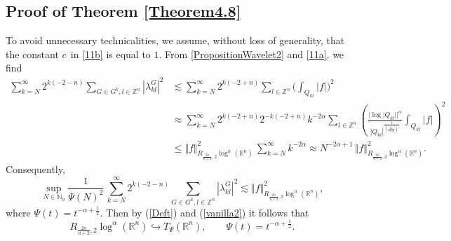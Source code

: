 \documentclass[11pt, a4paper,leqno]{amsart}
\theoremstyle{plain}
\numberwithin{equation}{section}
\theoremstyle{definition}
\theoremstyle{remark}
\begin{document}
\subsection{Proof of Theorem \ref{Theorem4.8}}
To avoid unnecessary technicalities, we assume, without loss of
generality, that the constant $c~\ $in \eqref{11b} is equal to $1.$ From \eqref{PropositionWavelet2} and 
\eqref{11a}, we find
\begin{align*}
\sum_{k=N}^{\infty}2^{k(-2-n)}\sum_{G\in G^{k},l\in\mathbb{Z}^{n}}|\lambda
_{k l}^{G}|^{2}  &  \lesssim\sum_{k=N}^{\infty}2^{k(-2+n)}\sum_{l\in
\mathbb{Z}^{n}}\bigg(\int_{Q_{kl}}|f|\bigg)^{2}\\
&  \approx \sum_{k=N}^{\infty}2^{k(-2+n)}2^{-k (-2+n)}k^{-2\alpha}%
\sum_{l\in\mathbb{Z}^{n}}\left(   \frac{|\log|Q_{kl}||^{\alpha}%
}{|Q_{kl}|^{\frac{1}{(\frac{2n}{n+2})^{\prime}}}}\int_{Q_{kl}}|f|\right)
^{2}\\
&  \leq\Vert f\Vert_{R_{\frac{2n}{n+2},2}\log^{\alpha}(\mathbb{R}^{n})}%
^{2}\,\sum_{k=N}^{\infty}k^{-2\alpha} \approx N^{-2\alpha+1}\,\Vert f\Vert_{R_{\frac{2n}{n+2},2}\log^{\alpha
}(\mathbb{R}^{n})}^{2}.
\end{align*}
Consequently,
\[
\sup_{N\in\mathbb{N}_{0}}\frac{1}{\Psi(N)^{2}}\,\sum_{k=N}^{\infty}%
2^{k(-2-n)}\sum_{G\in G^{k},l\in\mathbb{Z}^{n}}|\lambda_{k l}^{G}|^{2}%
\lesssim\Vert f\Vert_{R_{\frac{2n}{n+2},2}\log^{\alpha}(\mathbb{R}^{n})}^{2},
\]
where $\Psi(t)=t^{-\alpha+\frac{1}{2}}$. Then by (\ref{Deft}) and (\ref{vanilla2})
it follows that
\begin{equation}\label{strictR}
R_{\frac{2n}{n+2},2}\log^{\alpha}(\mathbb{R}^{n})\hookrightarrow T_{\Psi
}(\mathbb{R}^{n}),\qquad\Psi(t)=t^{-\alpha+\frac{1}{2}}.
\end{equation}
\end{document}
